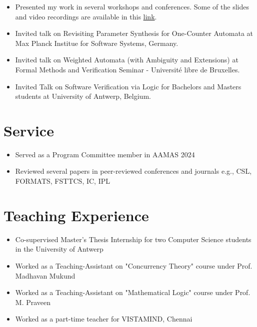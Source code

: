 \documentclass[a4paper,10pt]{article}
\begin{document}
\begin{itemize}    
    \item Presented my work in several workshops and conferences. Some of the slides and video recordings are available in this \href{https://ritamraha.github.io/talks/}{link}.
    
    \item Invited talk on Revisiting Parameter Synthesis for One-Counter Automata at Max Planck Institue for Software Systems, Germany.
 
	\item Invited talk on Weighted Automata (with Ambiguity and Extensions) at Formal Methods and Verification Seminar - Université libre de Bruxelles.
	\item Invited Talk on Software Verification via Logic for Bachelors and Masters students at University of Antwerp, Belgium.
\end{itemize}


\section{Service}
\begin{itemize}
	\item Served as a Program Committee member in AAMAS 2024
    \item Reviewed several papers in peer-reviewed conferences and journals e.g., CSL, FORMATS, 	FSTTCS, IC, IPL
   \end{itemize}

\section{Teaching Experience}
\begin{itemize}
\item Co-supervised Master's Thesis Internship for two Computer Science students in the University of Antwerp
\item Worked as a Teaching-Assistant on "Concurrency Theory" course under Prof. Madhavan Mukund
\item Worked as a Teaching-Assistant on "Mathematical Logic" course under Prof. M. Praveen
\item Worked as a part-time teacher for VISTAMIND, Chennai
\end{itemize}
\end{document}
